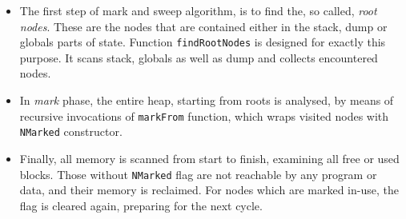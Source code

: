 \documentclass[12pt,a4paper]{report}
\begin{document}
\begin{itemize}
  \item The first step of mark and sweep algorithm, is to find the, so called,
    \textit{root nodes}. These are the nodes that are contained either in the
    stack, dump or globals parts of state. Function \texttt{findRootNodes} is
    designed for exactly this purpose. It scans stack, globals as well as dump
    and collects encountered nodes.
  \item In \textit{mark} phase, the entire heap, starting from roots is
    analysed, by means of recursive invocations of \texttt{markFrom} function,
    which wraps visited nodes with \texttt{NMarked} constructor.
  \item Finally, all memory is scanned from start to finish, examining all free
    or used blocks. Those without \texttt{NMarked} flag are not reachable
    by any program or data, and their memory is reclaimed. For nodes which are
    marked in-use, the flag is cleared again, preparing for the next
    cycle.
\end{itemize}




\end{document}
